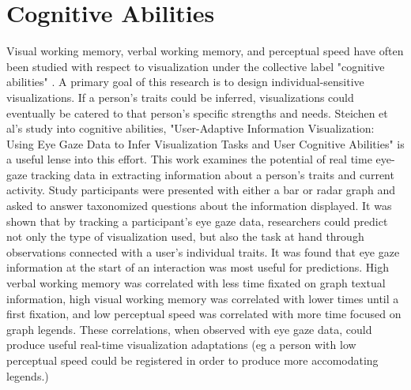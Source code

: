 \documentclass[conference]{IEEEtran}
\begin{document}
\section{Cognitive Abilities}
Visual working memory, verbal working memory, and perceptual speed have often
been studied with respect to visualization under the collective label
"cognitive abilities" \cite{UserAdaptive, HighlightingInterventions, ConatiLayouts}.
A primary goal of this research is to design individual-sensitive
visualizations. If a person's traits could be inferred, visualizations could
eventually be catered to that person's specific strengths and needs. Steichen
et al's study into cognitive abilities, "User-Adaptive Information Visualization:
Using Eye Gaze Data to Infer Visualization Tasks and User Cognitive Abilities"
is a useful lense into this effort\cite{UserAdaptive}. This work examines the
potential of real time eye-gaze tracking data in extracting information about
a person's traits and current activity. Study participants were presented
with either a bar or radar graph and asked to answer taxonomized questions
about the information displayed. It was shown that by tracking a participant's
eye gaze data, researchers could predict not only the type of visualization
used, but also the task at hand through observations connected with a user's
individual traits. It was found that eye gaze information at the start of an
interaction was most useful for predictions. High verbal working memory
was correlated with less time fixated on graph textual information, high
visual working memory was correlated with lower times until a first fixation,
and low perceptual speed was correlated with more time focused on graph legends.
These correlations, when observed with eye gaze data, could produce useful
real-time visualization adaptations (eg a person with low perceptual speed
could be registered in order to produce more accomodating legends.)
\end{document}
